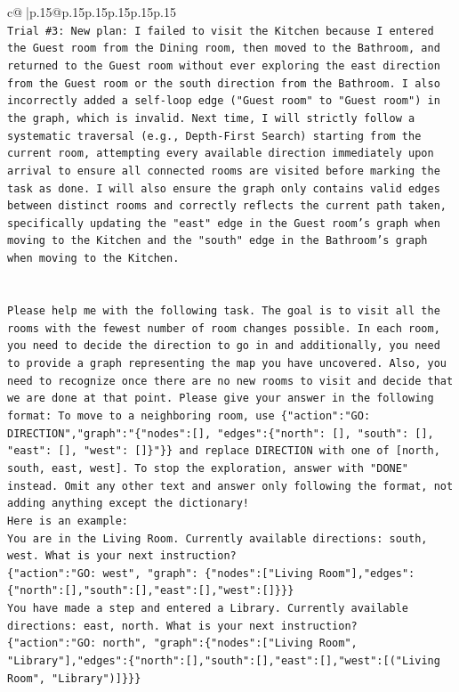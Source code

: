 \documentclass{article}
\begin{document}
{\begin{supertabular}{c@{$\;$}|p{.15\linewidth}@{}p{.15\linewidth}p{.15\linewidth}p{.15\linewidth}p{.15\linewidth}p{.15\linewidth}}
{{{\\ 
\texttt{Trial \#3: New plan: I failed to visit the Kitchen because I entered the Guest room from the Dining room, then moved to the Bathroom, and returned to the Guest room without ever exploring the east direction from the Guest room or the south direction from the Bathroom. I also incorrectly added a self{-}loop edge ("Guest room" to "Guest room") in the graph, which is invalid. Next time, I will strictly follow a systematic traversal (e.g., Depth{-}First Search) starting from the current room, attempting every available direction immediately upon arrival to ensure all connected rooms are visited before marking the task as done. I will also ensure the graph only contains valid edges between distinct rooms and correctly reflects the current path taken, specifically updating the "east" edge in the Guest room's graph when moving to the Kitchen and the "south" edge in the Bathroom's graph when moving to the Kitchen.} \\
\\ 
\\ 
\texttt{Please help me with the following task. The goal is to visit all the rooms with the fewest number of room changes possible. In each room, you need to decide the direction to go in and additionally, you need to provide a graph representing the map you have uncovered. Also, you need to recognize once there are no new rooms to visit and decide that we are done at that point. Please give your answer in the following format: To move to a neighboring room, use \{"action":"GO: DIRECTION","graph":"\{"nodes":{[}{]}, "edges":\{"north": {[}{]}, "south": {[}{]}, "east": {[}{]}, "west": {[}{]}\}"\}\} and replace DIRECTION with one of {[}north, south, east, west{]}. To stop the exploration, answer with "DONE" instead. Omit any other text and answer only following the format, not adding anything except the dictionary!} \\
\texttt{Here is an example: } \\
\texttt{You are in the Living Room. Currently available directions: south, west. What is your next instruction?} \\
\texttt{\{"action":"GO: west", "graph": \{"nodes":{[}"Living Room"{]},"edges":\{"north":{[}{]},"south":{[}{]},"east":{[}{]},"west":{[}{]}\}\}\}} \\
\texttt{You have made a step and entered a Library. Currently available directions: east, north. What is your next instruction?} \\
\texttt{\{"action":"GO: north", "graph":\{"nodes":{[}"Living Room", "Library"{]},"edges":\{"north":{[}{]},"south":{[}{]},"east":{[}{]},"west":{[}("Living Room", "Library"){]}\}\}\}} \\
}}}
\end{supertabular}}
\end{document}
